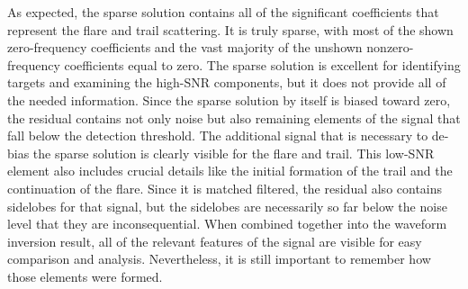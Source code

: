 As expected, the sparse solution contains all of the significant coefficients that represent the flare and trail scattering. It is truly sparse, with most of the shown zero-frequency coefficients and the vast majority of the unshown nonzero-frequency coefficients equal to zero. The sparse solution is excellent for identifying targets and examining the high-SNR components, but it does not provide all of the needed information. Since the sparse solution by itself is biased toward zero, the residual contains not only noise but also remaining elements of the signal that fall below the detection threshold. The additional signal that is necessary to de-bias the sparse solution is clearly visible for the flare and trail. This low-SNR element also includes crucial details like the initial formation of the trail and the continuation of the flare. Since it is matched filtered, the residual also contains sidelobes for that signal, but the sidelobes are necessarily so far below the noise level that they are inconsequential. When combined together into the waveform inversion result, all of the relevant features of the signal are visible for easy comparison and analysis. Nevertheless, it is still important to remember how those elements were formed.

